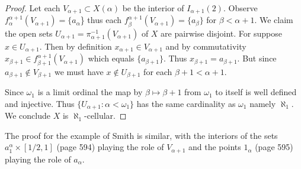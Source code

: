 \documentclass[12pt]{article}
\theoremstyle{plain}
\theoremstyle{definition}
\newcounter{claim5counter}
\newcommand{\A}{\ensuremath{\alpha}}
\newcommand{\B}{\ensuremath{\beta}}
\newcommand{\W}{\ensuremath{\omega}}
\newcommand{\0}{\ensuremath{\varnothing}}
\begin{document}
	\begin{proof}
		Let each $V_{\A+1} \subset X(\A)$ be the interior of $I_{\A+1}(2)$.
		Observe $f^{\A+1}_\A(V_{\A+1}) = \{a_\A$\} thus each $f^{\A+1}_{\B}(V_{\A+1}) = \{a_{\B}\}$ for $\B < \A+1$.
		We claim the open sets $U_{\A+1} = \pi_{\A+1}^{-1}(V_{\A+1})$ of $X$ are pairwise disjoint.
		For suppose $x \in U_{\A+1}$. 
		Then by definition $x_{\A+1} \in V_{\A+1}$ and by commutativity $x_{\B+1} \in f^{\A+1}_{\B+1}(V_{\A+1})$ which equals $ \{a_{\B+1}\}$. Thus $x_{\B+1} = a_{\B+1}$. But since $a_{\B+1} \notin V_{\B+1}$ we must have $x \notin U_{\B+1}$
		for each $\B+1 < \A+1$.
		
		Since $\W_1$ is a limit ordinal the map by $\B \mapsto \B+1$ from $\W_1$ to itself is well defined and injective.
		Thus $\{U_{\A+1}: \A < \W_1\}$ has the same cardinality as $\W_1$ namely $\aleph_1$.
		We conclude $X$ is $\aleph_1$-cellular.
	\end{proof}
	
	The proof for the example of Smith \cite{Smith1} is similar, 
	with the interiors of the sets $a^\A_1 \times [1/2,1]$ (page 594) playing the role of $V_{\A+1}$
	and the points $1_\A$ (page 595) playing the role of $a_\A$.
	
	
\end{document}
